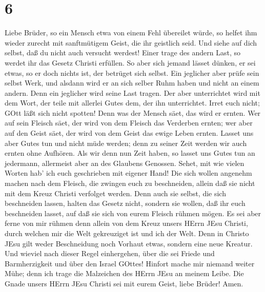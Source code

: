 \hypertarget{section-5}{%
\section{6}\label{section-5}}

 Liebe Brüder, so ein Mensch etwa von einem Fehl übereilet
würde, so helfet ihm wieder zurecht mit sanftmütigem Geist, die ihr
geistlich seid. Und siehe auf dich selbst, daß du nicht auch versucht
werdest!  Einer trage des andern Last, so werdet ihr das
Gesetz Christi erfüllen.  So aber sich jemand lässet dünken,
er sei etwas, so er doch nichts ist, der betrüget sich selbst.
 Ein jeglicher aber prüfe sein selbst Werk, und alsdann wird
er an sich selber Ruhm haben und nicht an einem andern. 
Denn ein jeglicher wird seine Last tragen.  Der aber
unterrichtet wird mit dem Wort, der teile mit allerlei Gutes dem, der
ihn unterrichtet.  Irret euch nicht; GOtt läßt sich nicht
spotten! Denn was der Mensch säet, das wird er ernten.  Wer
auf sein Fleisch säet, der wird von dem Fleisch das Verderben ernten;
wer aber auf den Geist säet, der wird von dem Geist das ewige Leben
ernten.  Lasset uns aber Gutes tun und nicht müde werden;
denn zu seiner Zeit werden wir auch ernten ohne Aufhören. 
Als wir denn nun Zeit haben, so lasset uns Gutes tun an jedermann,
allermeist aber an des Glaubens Genossen.  Sehet, mit wie
vielen Worten hab' ich euch geschrieben mit eigener Hand! 
Die sich wollen angenehm machen nach dem Fleisch, die zwingen euch zu
beschneiden, allein daß sie nicht mit dem Kreuz Christi verfolget
werden.  Denn auch sie selbst, die sich beschneiden lassen,
halten das Gesetz nicht, sondern sie wollen, daß ihr euch beschneiden
lasset, auf daß sie sich von eurem Fleisch rühmen mögen. 
Es sei aber ferne von mir rühmen denn allein von dem Kreuz unsers HErrn
JEsu Christi, durch welchen mir die Welt gekreuziget ist und ich der
Welt.  Denn in Christo JEsu gilt weder Beschneidung noch
Vorhaut etwas, sondern eine neue Kreatur.  Und wieviel nach
dieser Regel einhergehen, über die sei Friede und Barmherzigkeit und
über den Israel GOttes!  Hinfort mache mir niemand weiter
Mühe; denn ich trage die Malzeichen des HErrn JEsu an meinem Leibe.
 Die Gnade unsers HErrn JEsu Christi sei mit eurem Geist,
liebe Brüder! Amen.

